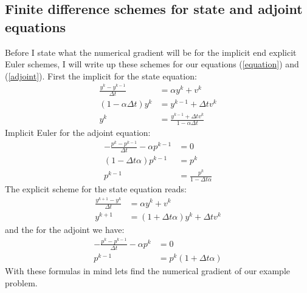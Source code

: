 \subsection{Finite difference schemes for state and adjoint equations}
Before I state what the numerical gradient will be for the implicit end explicit Euler schemes, I will write up these schemes for our equations (\ref{equation}) and (\ref{adjoint}). First the implicit for the state equation:
\begin{align}
\frac{y^k-y^{k-1}}{\Delta t} &= \alpha y^{k} + v^{k} \\
(1-\alpha\Delta t)y^{k} &= y^{k-1} +\Delta t v^{k} \\
y^k &=\frac{y^{k-1} +\Delta t v^{k}}{1-\alpha\Delta t} \label{I_state}
\end{align}
Implicit Euler for the adjoint equation:
\begin{align}
-\frac{p^k-p^{k-1}}{\Delta t} -\alpha p^{k-1} &=0 \\
(1-\Delta t\alpha)p^{k-1}&=p^k \\
p^{k-1} &= \frac{p^k}{1-\Delta t\alpha} \label{I_adjoint}
\end{align}
The explicit scheme for the state equation reads:
\begin{align}
\frac{y^{k+1}-y^{k}}{\Delta t} &= \alpha y^{k} + v^{k} \\
y^{k+1}&=(1 +\Delta t\alpha) y^{k} + \Delta t v^{k}\label{E_state}
\end{align} 
and the for the adjoint we have:
\begin{align}
-\frac{p^k-p^{k-1}}{\Delta t} -\alpha p^{k} &=0 \\
p^{k-1} &=p^k(1 +\Delta t\alpha)\label{E_adjoint}
\end{align}
With these formulas in mind lets find the numerical gradient of our example problem.
